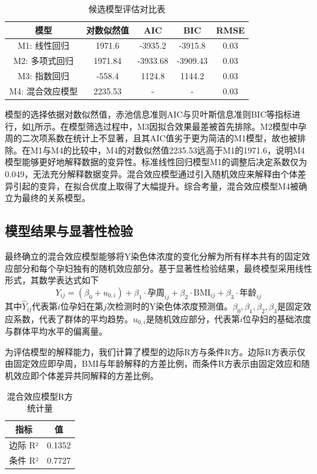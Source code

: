\begin{table}[h!]
	\centering
	\caption{候选模型评估对比表}
	\label{tab:模型评估对比表}
	\begin{tabular}{ccccc}
		\hline
		模型         & 对数似然值   & AIC      & BIC      & RMSE \\
		\hline
		M1: 线性回归   & 1971.6  & -3935.2  & -3915.8  & 0.03 \\
		M2: 多项式回归  & 1971.84 & -3933.68 & -3909.43 & 0.03 \\
		M3: 指数回归   & -558.4  & 1124.8   & 1144.2   & 0.03 \\
		M4: 混合效应模型 & 2235.53 &     -     &     -     & 0.03 \\
		\hline
	\end{tabular}
\end{table}

模型的选择依据对数似然值，赤池信息准则AIC与贝叶斯信息准则BIC等指标进行，如\cref{tab:模型评估对比表}所示。在模型筛选过程中，M3因拟合效果最差被首先排除。M2模型中孕周的二次项系数在统计上不显著，且其AIC值劣于更为简洁的M1模型，故也被排除。在M1与M4的比较中，M4的对数似然值2235.53远高于M1的1971.6，说明M4模型能够更好地解释数据的变异性。标准线性回归模型M1的调整后决定系数仅为0.049，无法充分解释数据变异。混合效应模型通过引入随机效应来解释由个体差异引起的变异，在拟合优度上取得了大幅提升。综合考量，混合效应模型M4被确立为最终的关系模型。

\subsection{模型结果与显著性检验}
最终确立的混合效应模型能够将Y染色体浓度的变化分解为所有样本共有的固定效应部分和每个孕妇独有的随机效应部分。基于显著性检验结果，最终模型采用线性形式，其数学表达式如下
\begin{equation}
	\hat{Y}_{ij} = (\beta_0 + u_{0,i}) + \beta_1 \cdot \text{孕周}_{ij} + \beta_2 \cdot \text{BMI}_{ij} + \beta_3 \cdot \text{年龄}_{ij}
	\label{eq:mixed_model}
\end{equation}
其中$\hat{Y}_{ij}$代表第$i$位孕妇在第$j$次检测时的Y染色体浓度预测值。$\beta_0, \beta_1, \beta_2, \beta_3$是固定效应系数，代表了群体的平均趋势。$u_{0,i}$是随机效应部分，代表第$i$位孕妇的基础浓度与群体平均水平的偏离量。

为评估模型的解释能力，我们计算了模型的边际R方与条件R方。边际R方表示仅由固定效应即孕周，BMI与年龄解释的方差比例，而条件R方表示由固定效应和随机效应即个体差异共同解释的方差比例。
\begin{table}[h!]
	\centering
	\caption{混合效应模型R方统计量}
	\label{tab:R方统计量}
	\begin{tabular}{cc}
		\hline
		指标                     & 值     \\
		\hline
		边际 R² & 0.1352 \\
		条件 R² & 0.7727 \\
		\hline
	\end{tabular}
\end{table}

